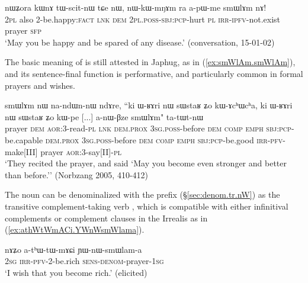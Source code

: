 \begin{exe}
	\ex \label{ex:tWscitnW.nWkWmNAm.smWlAm}
	\gll    nɯʑora kɯnɤ tɯ-scit-nɯ tɕe nɯ, nɯ-kɯ-mŋɤm ra a-pɯ-me smɯlɤm nɤ! \\
	\textsc{2pl} also 2-be.happy:\textsc{fact} \textsc{lnk} \textsc{dem} \textsc{2pl}.\textsc{poss}-\textsc{sbj}:\textsc{pcp}-hurt \textsc{pl} \textsc{irr}-\textsc{ipfv}-not.exist prayer \textsc{sfp} \\
	\glt `May you be happy and be spared of any disease.' (conversation, 15-01-02)
\end{exe}

The basic meaning of   is still attested in Japhug, as in (\ref{ex:smWlAm.smWlAm}), and its sentence-final function is performative, and particularly common in formal prayers and wishes.

\begin{exe}
	\ex \label{ex:smWlAm.smWlAm}
	\gll    smɯlɤm nɯ na-ndɯn-nɯ ndɤre, ``ki ɯ-ʁɤri nɯ sɯstaʁ ʑo kɯ-ɤcʰɯcʰa, ki ɯ-ʁɤri nɯ sɯstaʁ ʑo kɯ-pe [...] a-nɯ-βze smɯlɤm" ta-tɯt-nɯ \\
	prayer \textsc{dem} \textsc{aor}:3\flobv{}-read-\textsc{pl}  \textsc{lnk} \textsc{dem}.\textsc{prox} \textsc{3sg}.\textsc{poss}-before \textsc{dem} \textsc{comp} \textsc{emph} \textsc{sbj}:\textsc{pcp}-be.capable \textsc{dem}.\textsc{prox} \textsc{3sg}.\textsc{poss}-before  \textsc{dem} \textsc{comp}  \textsc{emph} \textsc{sbj}:\textsc{pcp}-be.good  {   } \textsc{irr}-\textsc{pfv}-make[III] prayer  \textsc{aor}:3\flobv{}-say[II]-\textsc{pl} \\
	\glt `They recited the prayer, and said `May you become even stronger and better than before.'' (Norbzang 2005, 410-412)
\end{exe}  

The noun  can be denominalized with the prefix  (§\ref {sec:denom.tr.nW}) as the transitive complement-taking verb , which is compatible with either infinitival complements or complement clauses in the Irrealis as in (\ref{ex:athWtWmACi.YWnWsmWlama}).

\begin{exe}
	\ex \label{ex:athWtWmACi.YWnWsmWlama}
	\gll  nɤʑo a-tʰɯ-tɯ-mɤɕi  ɲɯ-nɯ-smɯlam-a \\
	\textsc{2sg} \textsc{irr}-\textsc{pfv}-2-be.rich \textsc{sens}-\textsc{denom}-prayer-\textsc{1sg} \\
	\glt `I wish that you become rich.' (elicited)
\end{exe}  
